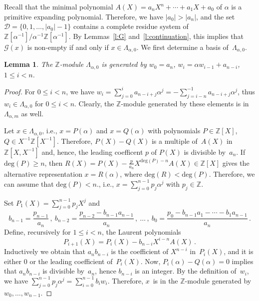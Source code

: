 \documentclass[12pt]{amsart}
\newtheorem{lemma}{Lemma}[section]
\theoremstyle{definition}
\theoremstyle{remark}
\numberwithin{equation}{section}
\begin{document}
Recall that the minimal polynomial $A(X) = a_n X^n + \cdots + a_1 X + a_0$ of $\alpha$ is a primitive expanding polynomial.
Therefore, we have $|a_0| > |a_n|$, and the set $\mathcal{D} = \{0, 1, \ldots, |a_0|-1\}$ contains a complete residue system of $\mathbb{Z}[\alpha^{-1}] / \alpha^{-1} \mathbb{Z}[\alpha^{-1}]$.
By Lemmas~\ref{l:G} and~\ref{l:continuation}, this implies that $\mathcal{G}(x)$ is non-empty if and only if $x \in \Lambda_{\alpha,0}$.
We first determine a basis of~$\Lambda_{\alpha,0}$.

\begin{lemma} \label{l:Lambda}
The $\mathbb{Z}$-module $\Lambda_{\alpha,0}$ is generated by $w_0 = a_n$, $w_i = \alpha w_{i-1} + a_{n-i} $, $1 \le i < n$.
\end{lemma}

\begin{proof}
For $0 \le i < n$, we have $w_i = \sum_{j=0}^i a_{n-i+j} \alpha^j = - \sum_{j=i-n}^{-1} a_{n-i+j} \alpha^j$, thus $w_i \in \Lambda_{\alpha,0}$ for $0 \le i < n$.
Clearly, the $\mathbb{Z}$-module generated by these elements is in $\Lambda_{\alpha,m}$ as well.

Let $x \in \Lambda_{\alpha,0}$, i.e., $x = P(\alpha)$ and $x = Q(\alpha)$ with polynomials $P \in \mathbb{Z}[X]$, $Q \in X^{-1} \mathbb{Z}[X^{-1}]$.
Therefore, $P(X) - Q(X)$ is a multiple of~$A(X)$ in $\mathbb{Z}[X,X^{-1}]$ and, hence, the leading coefficent $p$ of $P(X)$ is divisible by~$a_n$.
If $\mathrm{deg}(P) \ge n$, then $R(X) = P(X) - \frac{p}{a_n} X^{\mathrm{deg}(P)-n} A(X) \in \mathbb{Z}[X]$ gives the alternative representation $x = R(\alpha)$, where $\mathrm{deg}(R) < \mathrm{deg}(P)$.
Therefore, we can assume that $\mathrm{deg}(P) < n$., i.e., $x = \sum_{j=0}^{n-1} p_j \alpha^j$ with $p_j \in \mathbb{Z}$.

Set $P_1(X) = \sum_{j=0}^{n-1} p_j X^j$ and
\[
b_{n-1} = \frac{p_{n-1}}{a_n}\,,\ b_{n-2} = \frac{p_{n-2} - b_{n-1} a_{n-1}}{a_n}\,,\ \dots\,,\ b_0 = \frac{p_0 - b_{n-1} a_1 - \cdots - b_1 a_{n-1}}{a_n}\,.
\]
Define, recursively for $1 \le i < n$, the Laurent polynomials
\[
P_{i+1}(X) = P_i(X) - b_{n-i} X^{i-n} A(X)\,.
\]
Inductively we obtain that $a_n b_{n-i}$ is the coefficient of $X^{n-i}$ in~$P_i(X)$, and it is either $0$ or the leading coefficient of~$P_i(X)$.
Now, $P_i(\alpha) - Q(\alpha) = 0$ implies that $a_n b_{n-i}$ is divisible by~$a_n$, hence $b_{n-i}$ is an integer.
By the definition of~$w_i$, we have $\sum_{j=0}^{n-1} p_j \alpha^j = \sum_{i=0}^{n-1} b_i w_i$.
Therefore, $x$~is in the $\mathbb{Z}$-module generated by $w_0,\ldots,w_{n-1}$.
\end{proof}
\end{document}
